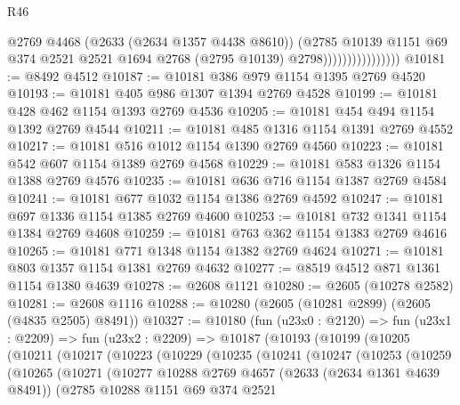 \begin{lexlean}{R46}
\begin{coremodule}
                                  @2769
                                  @4468
                                  (@2633 (@2634 @1357 @4438 @8610))
                                  (@2785
                                    @10139
                                    @1151
                                    @69
                                    @374
                                    @2521
                                    @2521
                                    @1694
                                    @2768
                                    (@2795 @10139)
                                    @2798))))))))))))))))
@10181 := @8492 @4512
@10187 := @10181 @386 @979 @1154 @1395 @2769 @4520
@10193 := @10181 @405 @986 @1307 @1394 @2769 @4528
@10199 := @10181 @428 @462 @1154 @1393 @2769 @4536
@10205 := @10181 @454 @494 @1154 @1392 @2769 @4544
@10211 := @10181 @485 @1316 @1154 @1391 @2769 @4552
@10217 := @10181 @516 @1012 @1154 @1390 @2769 @4560
@10223 := @10181 @542 @607 @1154 @1389 @2769 @4568
@10229 := @10181 @583 @1326 @1154 @1388 @2769 @4576
@10235 := @10181 @636 @716 @1154 @1387 @2769 @4584
@10241 := @10181 @677 @1032 @1154 @1386 @2769 @4592
@10247 := @10181 @697 @1336 @1154 @1385 @2769 @4600
@10253 := @10181 @732 @1341 @1154 @1384 @2769 @4608
@10259 := @10181 @763 @362 @1154 @1383 @2769 @4616
@10265 := @10181 @771 @1348 @1154 @1382 @2769 @4624
@10271 := @10181 @803 @1357 @1154 @1381 @2769 @4632
@10277 := @8519 @4512 @871 @1361 @1154 @1380 @4639
@10278 := @2608 @1121
@10280 := @2605 (@10278 @2582)
@10281 := @2608 @1116
@10288 := @10280 (@2605 (@10281 @2899) (@2605 (@4835 @2505) @8491))
@10327 := @10180
    (fun (u23x0 : @2120) =>
    fun (u23x1 : @2209) =>
    fun (u23x2 : @2209) =>
    @10187
      (@10193
        (@10199
          (@10205
            (@10211
              (@10217
                (@10223
                  (@10229
                    (@10235
                      (@10241
                        (@10247
                          (@10253
                            (@10259
                              (@10265
                                (@10271
                                  (@10277
                                    @10288
                                    @2769
                                    @4657
                                    (@2633 (@2634 @1361 @4639 @8491))
                                    (@2785
                                      @10288
                                      @1151
                                      @69
                                      @374
                                      @2521

\end{coremodule}
\end{lexlean}
